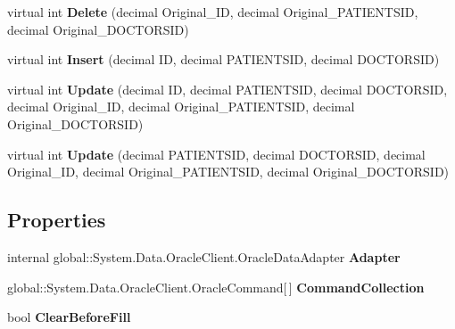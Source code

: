 \begin{CompactItemize}
\item 
virtual int \textbf{Delete} (decimal Original\_\-ID, decimal Original\_\-PATIENTSID, decimal Original\_\-DOCTORSID)\label{class_automatic_medical_system_1_1_data_set1_table_adapters_1_1_f_a_m_i_l_y___d_o_c_t_o_r_table_adapter_eb45af20b5b0125971305a002dba8978}

\item 
virtual int \textbf{Insert} (decimal ID, decimal PATIENTSID, decimal DOCTORSID)\label{class_automatic_medical_system_1_1_data_set1_table_adapters_1_1_f_a_m_i_l_y___d_o_c_t_o_r_table_adapter_782c4bb902103c88257866f202b59c33}

\item 
virtual int \textbf{Update} (decimal ID, decimal PATIENTSID, decimal DOCTORSID, decimal Original\_\-ID, decimal Original\_\-PATIENTSID, decimal Original\_\-DOCTORSID)\label{class_automatic_medical_system_1_1_data_set1_table_adapters_1_1_f_a_m_i_l_y___d_o_c_t_o_r_table_adapter_d399d56c6fdbe3163e77cd1a6cd35a82}

\item 
virtual int \textbf{Update} (decimal PATIENTSID, decimal DOCTORSID, decimal Original\_\-ID, decimal Original\_\-PATIENTSID, decimal Original\_\-DOCTORSID)\label{class_automatic_medical_system_1_1_data_set1_table_adapters_1_1_f_a_m_i_l_y___d_o_c_t_o_r_table_adapter_5fe98c87b129dc47b5b9686d80a508f0}

\end{CompactItemize}
\subsection*{Properties}
\begin{CompactItemize}
\item 
internal global::System.Data.OracleClient.OracleDataAdapter \textbf{Adapter}\hspace{0.3cm}{\tt  [get]}\label{class_automatic_medical_system_1_1_data_set1_table_adapters_1_1_f_a_m_i_l_y___d_o_c_t_o_r_table_adapter_a2b6fd360ca6baa74b2e720cde89499a}

\item 
global::System.Data.OracleClient.OracleCommand[$\,$] \textbf{CommandCollection}\hspace{0.3cm}{\tt  [get]}\label{class_automatic_medical_system_1_1_data_set1_table_adapters_1_1_f_a_m_i_l_y___d_o_c_t_o_r_table_adapter_3170fbe33f4c231aac74b74ac251e43f}

\item 
bool \textbf{ClearBeforeFill}\hspace{0.3cm}{\tt  [get, set]}\label{class_automatic_medical_system_1_1_data_set1_table_adapters_1_1_f_a_m_i_l_y___d_o_c_t_o_r_table_adapter_c94cc89a5792b7130eac68e08f916bc9}

\end{CompactItemize}



